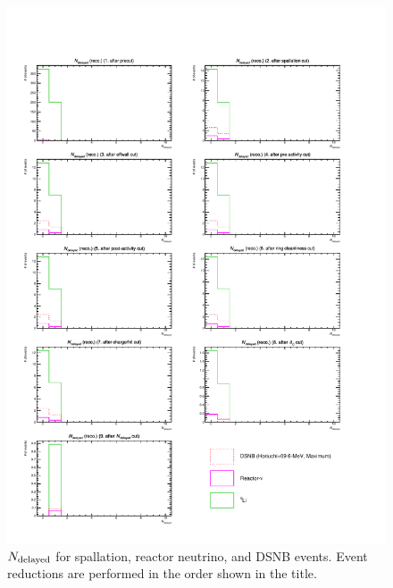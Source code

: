 \begin{figure}[h]
	\centering
	\includegraphics[width=15cm]{PDF/Dist_Nuebar/Che_50deg_tag_ge1/RecoNumCap}
	\caption[$N_{\rm delayed}$ for spallation, reactor neutrino, and DSNB events]{
	$N_{\rm delayed}$ for spallation, reactor neutrino, and DSNB events.
	Event reductions are performed in the order shown in the title.
	}\label{Nuebar_RecoNumCap}
\end{figure}

